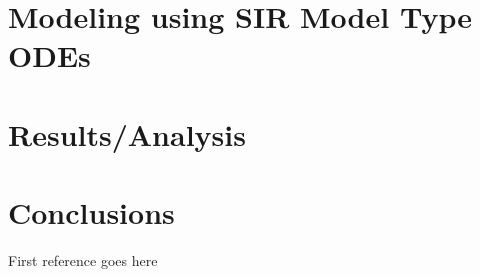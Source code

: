 \documentclass[12pt]{article}
\begin{document}
\section{Modeling using SIR Model Type ODEs}

\section{Results/Analysis}

\section{Conclusions}

\begin{thebibliography}{99}
 First reference goes here
\end{thebibliography}
\end{document}
